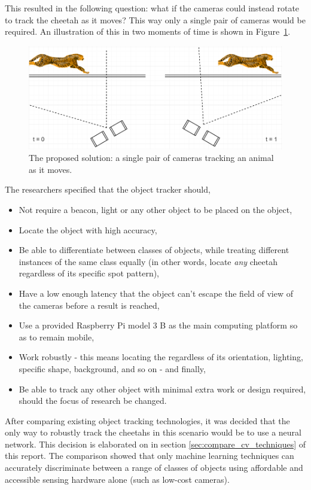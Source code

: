 This resulted in the following question: what if the cameras could instead rotate to track the cheetah as it moves? This way only a single pair of cameras would be required. An illustration of this in two moments of time is shown in Figure~\ref{fig:single_gopro_pair}.

\begin{figure}[h!]
  \centering
  \includegraphics[width=\textwidth]{single_gopro_pair}
  \caption{\label{fig:single_gopro_pair} The proposed solution: a single pair of cameras tracking an animal as it moves.}
\end{figure}

The researchers specified that the object tracker should,

\begin{itemize}
	\item Not require a beacon, light or any other object to be placed on the object,
	\item Locate the object with high accuracy,
	\item Be able to differentiate between classes of objects, while treating different instances of the same class equally (in other words, locate \emph{any} cheetah regardless of its specific spot pattern),
	\item Have a low enough latency that the object can't escape the field of view of the cameras before a result is reached,
	\item Use a provided Raspberry Pi model 3 B as the main computing platform so as to remain mobile,
	\item Work robustly - this means locating the regardless of its orientation, lighting, specific shape, background, and so on - and finally,
	\item Be able to track any other object with minimal extra work or design required, should the focus of research be changed.
\end{itemize}

After comparing existing object tracking technologies, it was decided that the only way to robustly track the cheetahs in this scenario would be to use a neural network. This decision is elaborated on in section \ref{sec:compare_cv_techniques} of this report. The comparison showed that only machine learning techniques can accurately discriminate between a range of classes of objects using affordable and accessible sensing hardware alone (such as low-cost cameras).



